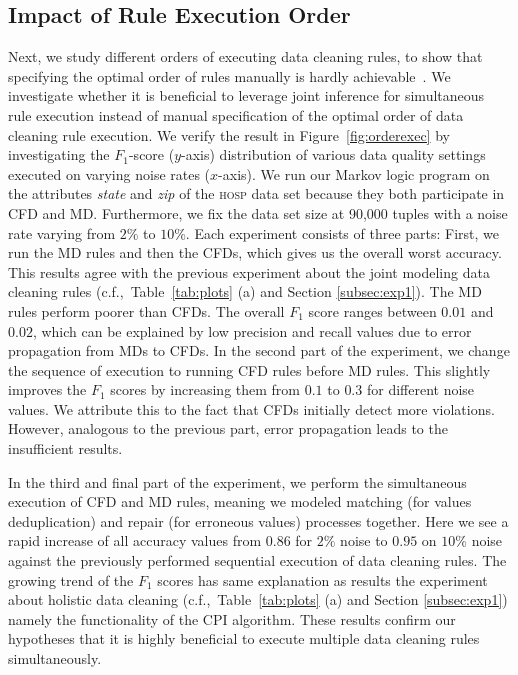 \subsection{Impact of Rule Execution Order}
\label{subsec:exp3}
Next, we study different orders of executing data cleaning rules, to show that specifying the optimal order of rules manually is hardly achievable~\cite{Dallachiesa:2013:NCD:2463676.2465327}. We investigate whether it is beneficial to leverage joint inference for simultaneous rule execution instead of manual specification of the optimal order of data cleaning rule execution. We verify the result in Figure~\ref{fig:orderexec} by investigating the $F_1$-score ($y$-axis) distribution of various data quality settings executed on varying noise rates ($x$-axis). We run our Markov logic program on the attributes \textsl{state} and \textsl{zip} of the \textsc{hosp} data set because they both participate in CFD and MD. Furthermore, we fix the data set size at 90,000 tuples with a noise rate varying from $2\%$ to $10\%$. Each experiment consists of three parts: First, we run the MD rules and then the CFDs, which gives us the overall worst accuracy. This results agree with the previous experiment about the joint modeling data cleaning rules (c.f.,~Table~\ref{tab:plots} (a) and Section \ref{subsec:exp1}). The MD rules perform poorer than CFDs. The overall $F_1$ score ranges between $0.01$ and $0.02$, which can be explained by low precision and recall values due to error propagation from MDs to CFDs.  
In the second part of the experiment, we change the sequence of execution to running CFD rules before MD rules. This slightly improves the $F_1$ scores by increasing them from $0.1$ to $0.3$ for different noise values. We attribute this to the fact that CFDs initially detect more violations. However, analogous to the previous part, error propagation leads to the insufficient results. 

In the third and final part of the experiment, we perform the simultaneous execution of CFD and MD rules, meaning we modeled matching (for values deduplication) and repair (for erroneous values) processes together. Here we see a rapid increase of all accuracy values from $0.86$ for $2\%$ noise to $0.95$ on $10\%$ noise against the previously performed sequential execution of data cleaning rules. The growing trend of the $F_1$ scores has same explanation as results the experiment about holistic data cleaning (c.f.,~Table~\ref{tab:plots} (a) and Section \ref{subsec:exp1}) namely the functionality of the CPI algorithm. These results confirm our hypotheses that it is highly beneficial to execute multiple data cleaning rules simultaneously.  

